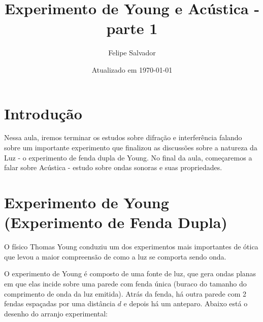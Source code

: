 \documentclass[12pt]{extarticle}
\title{Experimento de Young e Acústica - parte 1}
\author{Felipe Salvador}
\date{Atualizado em \today}
\newcommand{\<}{\langle}
\renewcommand{\>}{\rangle}
\theoremstyle{definition}
\begin{document}
\maketitle

\section{Introdução}
Nessa aula, iremos terminar os estudos sobre difração e interferência falando sobre um importante experimento que finalizou as discussões sobre a natureza da Luz - o experimento de fenda dupla de Young. No final da aula, começaremos a falar sobre Acústica - estudo sobre ondas sonoras e suas propriedades.
\section{Experimento de Young (Experimento de Fenda Dupla)}
O físico Thomas Young conduziu um dos experimentos mais importantes de ótica que levou a maior compreensão de como a luz se comporta sendo onda. 

O experimento de Young é composto de uma fonte de luz, que gera ondas planas em que elas incide sobre uma parede com fenda única (buraco do tamanho do comprimento de onda da luz emitida). Atrás da fenda, há outra parede com 2 fendas espaçadas por uma distância $d$ e depois há um anteparo. Abaixo está o desenho do arranjo experimental:
\end{document}
